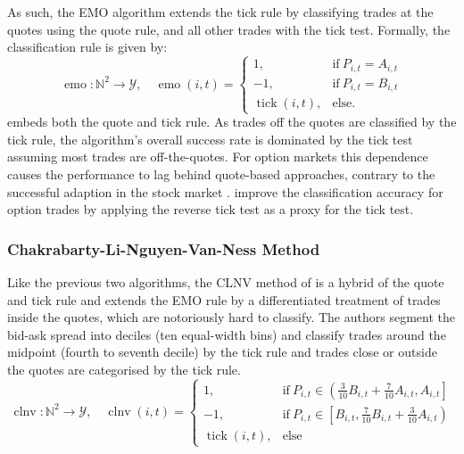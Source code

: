 As such, the \gls{EMO} algorithm extends the tick rule by classifying trades at the quotes using the quote rule, and all other trades with the tick test. Formally, the classification rule is given by:
\begin{equation}
    \operatorname{emo} \colon \mathbb{N}^2 \to \mathcal{Y}, \quad
    \operatorname{emo}(i, t)=
    \begin{cases}
        1,                         & \mathrm{if}\ P_{i, t} = A_{i, t} \\
        -1,                        & \mathrm{if}\ P_{i, t} = B_{i, t} \\
        \operatorname{tick}(i, t), & \mathrm{else}.
    \end{cases}
    \label{eq:emo-rule}
\end{equation}
 embeds both the quote and tick rule. As trades off the quotes are classified by the tick rule, the algorithm's overall success rate is dominated by the tick test assuming most trades are off-the-quotes. For option markets \autocites[cp.][891]{savickasInferringDirectionOption2003}[][21]{grauerOptionTradeClassification2022} this dependence causes the performance to lag behind quote-based approaches, contrary to the successful adaption in the stock market \autocites[][541]{ellisAccuracyTradeClassification2000}[][3818]{chakrabartyTradeClassificationAlgorithms2007}. \textcite[][31--35]{grauerOptionTradeClassification2022} improve the classification accuracy for option trades by applying the reverse tick test as a proxy for the tick test.

\subsubsection{Chakrabarty-Li-Nguyen-Van-Ness
    Method}\label{sec:chakarabarty-li-nguyen-van-ness-method}

Like the previous two algorithms, the \gls{CLNV} method of \textcite[][3809]{chakrabartyTradeClassificationAlgorithms2012} is a hybrid of the quote and tick rule and extends the \gls{EMO} rule by a differentiated treatment of trades inside the quotes, which are notoriously hard to classify. The authors segment the bid-ask spread into deciles (ten equal-width bins) and classify trades around the midpoint (fourth to seventh decile) by the tick rule and trades close or outside the quotes are categorised by the tick rule.
\begin{equation}
    \operatorname{clnv} \colon \mathbb{N}^2 \to \mathcal{Y}, \quad
    \operatorname{clnv}(i, t)=
    \begin{cases}
        1,                         & \mathrm{if}\ P_{i, t} \in \left(\frac{3}{10} B_{i,t} + \frac{7}{10} A_{i,t}, A_{i, t}\right] \\
        -1,                        & \mathrm{if}\ P_{i, t} \in \left[ B_{i,t}, \frac{7}{10} B_{i,t} + \frac{3}{10} A_{i,t}\right) \\
        \operatorname{tick}(i, t), & \mathrm{else}
    \end{cases}
    \label{eq:CLNV-rule}
\end{equation}

